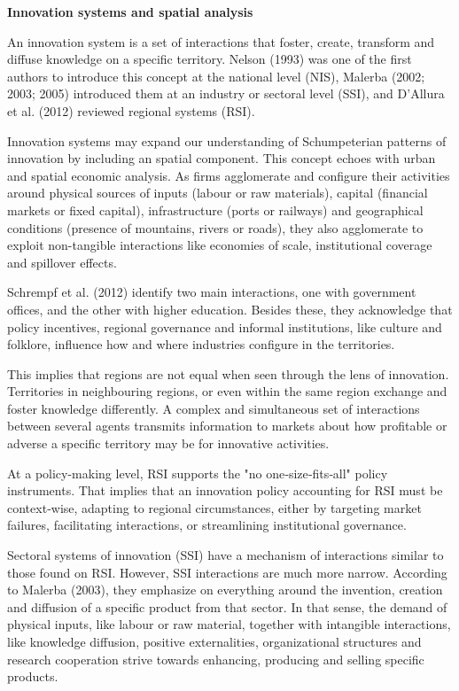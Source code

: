 \documentclass[12pt,a4paper]{article}
\begin{document}
\noindent \textbf{Innovation systems and spatial analysis}

An innovation system is a set of interactions that foster, create, transform and diffuse knowledge on a specific territory. Nelson (1993) was one of the first authors to introduce this concept at the national level (NIS), Malerba (2002; 2003; 2005) introduced them at an industry or sectoral level (SSI), and D’Allura et al. (2012) reviewed regional systems (RSI).

Innovation systems may expand our understanding of Schumpeterian patterns of innovation by including an spatial component. This concept echoes with urban and spatial economic analysis. As firms agglomerate and configure their activities around physical sources of inputs (labour or raw materials), capital (financial markets or fixed capital), infrastructure (ports or railways) and geographical conditions (presence of mountains, rivers or roads), they also agglomerate to exploit non-tangible interactions like economies of scale, institutional coverage and spillover effects. 

Schrempf et al. (2012) identify two main interactions, one with government offices, and the other with higher education. Besides these, they acknowledge that policy incentives, regional governance and informal institutions, like culture and folklore, influence how and where industries configure in the territories.

This implies that regions are not equal when seen through the lens of innovation. Territories in neighbouring regions, or even within the same region exchange and foster knowledge differently. A complex and simultaneous set of interactions between several agents transmits information to markets about how profitable or adverse a specific territory may be for innovative activities.

At a policy-making level, RSI supports the "no one‐size‐fits‐all" policy instruments. That implies that an innovation policy accounting for RSI must be context‐wise, adapting to regional circumstances, either by targeting market failures, facilitating interactions, or streamlining institutional governance. 

Sectoral systems of innovation (SSI) have a mechanism of interactions similar to those found on RSI. However, SSI interactions are much more narrow. According to Malerba (2003), they emphasize on everything around the invention, creation and diffusion of a specific product from that sector. In that sense, the demand of physical inputs, like labour or raw material, together with intangible interactions, like knowledge diffusion, positive externalities, organizational structures and research cooperation strive towards enhancing, producing and selling specific products. 
\end{document}
